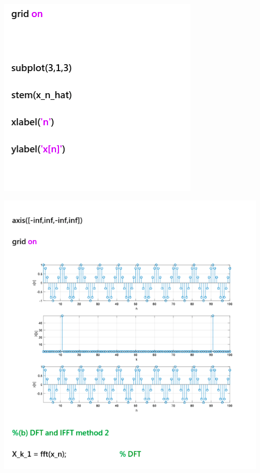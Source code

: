 \documentclass[a4paper]{article}
\begin{document}
	\begin{center}
		\includegraphics[width=1\linewidth]{screenshot086}
	\end{center}
	
	\begin{center}
		\includegraphics[width=1\linewidth]{screenshot087}
	\end{center}
	
\end{document}
